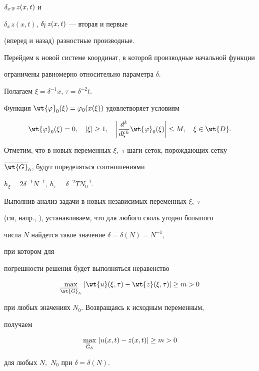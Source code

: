 $\delta_{x\,\overline{x}}\,z(x,t)$ и


$\delta_{x\,}z(x,t)$, $\delta_{\overline{t}}\,z(x,t)$ --- вторая и первые 


(вперед и назад) разностные производные.





Перейдем к новой системе координат, в которой производные начальной функции 


ограничены равномерно относительно параметра $\delta$. 


Полагаем $\xi=\delta^{-1}x$, $\tau=\delta^{-2}t$.


Функция $\wt{\vf}_0(\xi)=\vf_0(x(\xi))$ удовлетворяет условиям 


$$


\wt{\vf}_0(\xi)=0,\quad |\xi| \ge 1,\quad \left| \frac{d^k}{d\xi^k}


\wt{\vf}_0(\xi) \right| \le M,\quad \xi\in\wt{D}.


$$


Отметим, что в новых переменных $\xi,$ $\tau$ шаги сеток, порождающих сетку


$\ovl{\wt{G}}_h$, будут определяться соотношениями 


$h_{\xi}=2\delta^{-1}N^{-1}$, $h_{\tau}=\delta^{-2}TN_0^{-1}$.





Выполнив анализ задачи в новых независимых переменных $\xi,$ $\tau$ 


(см, напр., \cite{Sh3}), устанавливаем, что для любого сколь угодно большого 


числа $N$ найдется такое значение $\delta=\delta(N)=N^{-1}$, 


при котором для 


погрешности решения будет выполняться неравенство


$$


\max\limits_{\ovl{\wt{G}}_h}\, |


\wt{u}(\xi,\tau)-\wt{z}(\xi,\tau) | \ge m>0


$$


при любых значениях $N_0$. Возвращаясь к исходным переменным,


получаем


$$


\max\limits_{\ovl{G}_h}\, |u(x,t)-z(x,t) | \ge m>0


$$


для любых $N,$ $N_0$ при $\delta=\delta(N)$.


